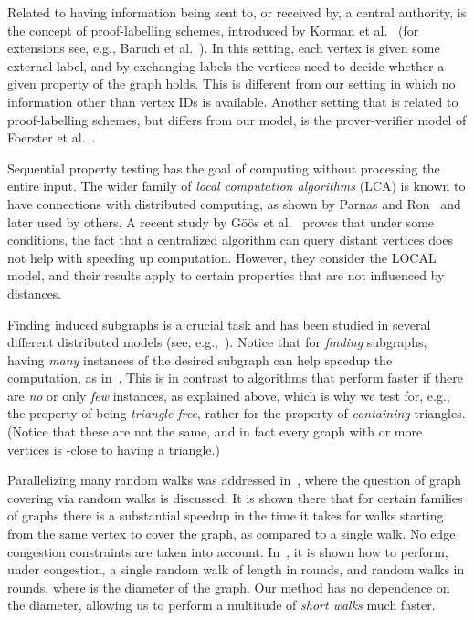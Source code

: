 \documentclass[11pt]{article}
\begin{document}
Related to having information being sent to, or received by, a central authority, is the concept of proof-labelling schemes, introduced by Korman et al.~\cite{KormanKP10} (for extensions see, e.g., Baruch et al.~\cite{BaruchFP15}). In this setting, each vertex is given some external label, and by exchanging labels the vertices need to decide whether a given property of the graph holds. This is different from our setting in which no information other than vertex IDs is available. Another setting that is related to proof-labelling schemes, but differs from our model, is the prover-verifier model of Foerster et al.~\cite{FoersterLSW16}.

Sequential property testing has the goal of computing without processing the entire input. The wider family of \emph{local computation algorithms} (LCA) is known to have connections with distributed computing, as shown by Parnas and Ron~\cite{ParnasR07} and later used by others. A recent study by G\"{o}\"{o}s et al.~\cite{goos2015non} proves that under some conditions, the fact that a centralized algorithm can query distant vertices does not help with speeding up computation. However, they consider the LOCAL model, and their results apply to certain properties that are not influenced by distances.

Finding induced subgraphs is a crucial task and has been studied in several different distributed models (see, e.g.,~\cite{KariMRS15,DruckerKO12,Censor-HillelKK15,DolevLP12}). Notice that for \emph{finding} subgraphs, having \emph{many} instances of the desired subgraph can help speedup the computation, as in~\cite{DolevLP12}. This is in contrast to algorithms that perform faster if there are \emph{no} or only \emph{few} instances, as explained above, which is why we test for, e.g., the property of being \emph{triangle-free}, rather for the property of \emph{containing} triangles. (Notice that these are not the same, and in fact every graph with  or more vertices is -close to having a triangle.)


Parallelizing many random walks was addressed in~\cite{AlonAKKLT11}, where the question of graph covering via random walks is discussed. It is shown there that for certain families of graphs there is a substantial speedup in the time it takes for  walks starting from the same vertex to cover the graph, as compared to a single walk. No edge congestion constraints are taken into account.
In~\cite{SarmaNPT13}, it is shown how to perform, under congestion, a single random walk of length  in  rounds, and  random walks in  rounds, where  is the diameter of the graph. Our method has no dependence on the diameter, allowing us to perform a multitude of \emph{short walks} much faster.
\end{document}
